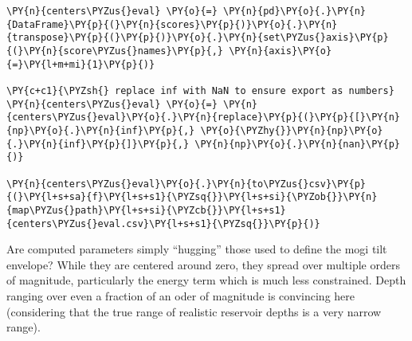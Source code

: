 \begin{tcolorbox}[breakable, size=fbox, boxrule=1pt, pad at break*=1mm,colback=cellbackground, colframe=cellborder]
\begin{Verbatim}[commandchars=\\\{\}]
\PY{n}{centers\PYZus{}eval} \PY{o}{=} \PY{n}{pd}\PY{o}{.}\PY{n}{DataFrame}\PY{p}{(}\PY{n}{scores}\PY{p}{)}\PY{o}{.}\PY{n}{transpose}\PY{p}{(}\PY{p}{)}\PY{o}{.}\PY{n}{set\PYZus{}axis}\PY{p}{(}\PY{n}{score\PYZus{}names}\PY{p}{,} \PY{n}{axis}\PY{o}{=}\PY{l+m+mi}{1}\PY{p}{)}

\PY{c+c1}{\PYZsh{} replace inf with NaN to ensure export as numbers}
\PY{n}{centers\PYZus{}eval} \PY{o}{=} \PY{n}{centers\PYZus{}eval}\PY{o}{.}\PY{n}{replace}\PY{p}{(}\PY{p}{[}\PY{n}{np}\PY{o}{.}\PY{n}{inf}\PY{p}{,} \PY{o}{\PYZhy{}}\PY{n}{np}\PY{o}{.}\PY{n}{inf}\PY{p}{]}\PY{p}{,} \PY{n}{np}\PY{o}{.}\PY{n}{nan}\PY{p}{)}

\PY{n}{centers\PYZus{}eval}\PY{o}{.}\PY{n}{to\PYZus{}csv}\PY{p}{(}\PY{l+s+sa}{f}\PY{l+s+s1}{\PYZsq{}}\PY{l+s+si}{\PYZob{}}\PY{n}{map\PYZus{}path}\PY{l+s+si}{\PYZcb{}}\PY{l+s+s1}{centers\PYZus{}eval.csv}\PY{l+s+s1}{\PYZsq{}}\PY{p}{)}
\end{Verbatim}
\end{tcolorbox}

Are computed parameters simply ``hugging'' those used to define the mogi
tilt envelope? While they are centered around zero, they spread over
multiple orders of magnitude, particularly the energy term which is much
less constrained. Depth ranging over even a fraction of an oder of
magnitude is convincing here (considering that the true range of
realistic reservoir depths is a very narrow range).

